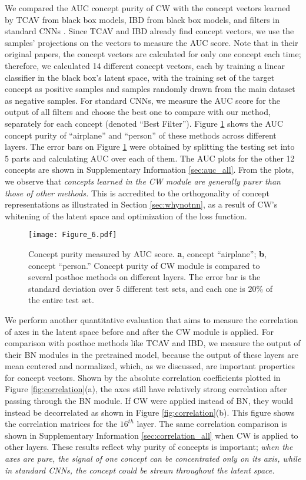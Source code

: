 \documentclass{article}
\begin{document}
We compared the AUC concept purity of CW with the concept vectors learned by TCAV \cite{kim2018interpretability} from black box models, IBD \cite{zhou2018interpretable} from black box models, and filters in standard CNNs \cite{zhou2014object}. Since TCAV and IBD already find concept vectors, we use the samples' projections on the vectors to measure the AUC score. Note that in their original papers, the concept vectors are calculated for only one concept each time; therefore, we calculated 14 different concept vectors, each by training a linear classifier in the black box's latent space, with the training set of the target concept as positive samples and samples randomly drawn from the main dataset as negative samples. For standard CNNs, we measure the AUC score for the output of all filters and choose the best one to compare with our method, separately for each concept (denoted ``Best Filter''). Figure \ref{fig:auc} shows the AUC concept purity of ``airplane'' and ``person'' of these methods across different layers. The error bars on Figure \ref{fig:auc} were obtained by splitting the testing set into 5 parts and calculating AUC over each of them. The AUC plots for the other 12 concepts are shown in Supplementary Information \ref{sec:auc_all}. From the plots, we observe that \textit{concepts learned in the CW module are generally purer than those of other methods.} This is accredited to the orthogonality of concept representations as illustrated in Section \ref{sec:whynotnn}, as a result of CW's whitening of the latent space and optimization of the loss function.
\begin{figure}[ht]
    \centering
    \texttt{[image: Figure\_6.pdf]}
    \caption{Concept purity measured by AUC score. \textbf{a}, concept ``airplane''; \textbf{b}, concept ``person.'' Concept purity of CW module is compared to several posthoc methods on different layers.  The error bar is the standard deviation over 5 different test sets, and each one is $20\%$ of the entire test set. \label{fig:auc}}
\end{figure}
We perform another quantitative evaluation that aims to measure the correlation of axes in the latent space before and after the CW module is applied. For comparison with posthoc methods like TCAV and IBD, we measure the output of their BN modules in the pretrained model, because the output of these layers are mean centered and normalized, which, as we discussed, are important properties for concept vectors. Shown by the absolute correlation coefficients plotted in Figure \ref{fig:correlation}(a), the axes still have relatively strong correlation after passing through the BN module. If CW were applied instead of BN, they would instead be decorrelated as shown in Figure \ref{fig:correlation}(b). This figure shows the correlation matrices for the $16^{th}$ layer. The same correlation comparison is shown in Supplementary Information \ref{sec:correlation_all} when CW is applied to other layers. These results reflect why purity of concepts is important; \textit{when the axes are pure, the signal of one concept can be concentrated only on its axis, while in standard CNNs, the concept could be strewn throughout the latent space.}
\end{document}
